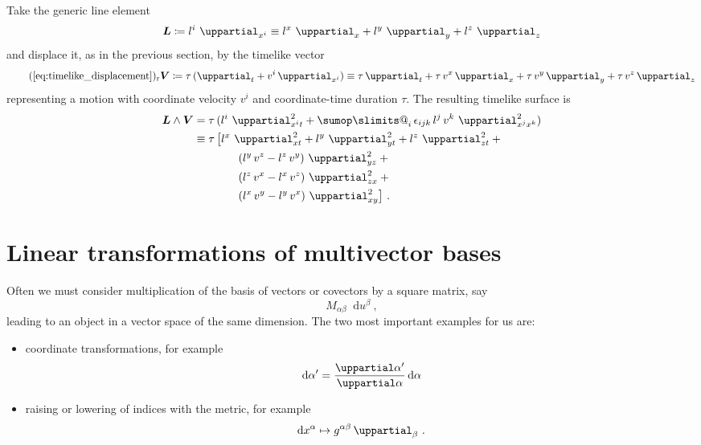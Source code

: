 \documentclass[a4paper,12pt,%
onecolumn,oneside,article,%
british%
]{memoir}
\makeatletter
\theoremstyle{remark}
\theoremstyle{innote}
\def\sum{\DOTSI\sumop\slimits@}
\newcommand*{\de}{\mathop{}\!\uppartial}%
\newcommand*{\di}{\mathop{}\!\mathrm{d}}%
\newcommand*{\defd}{\coloneqq}
\renewcommand*{\|}[1][]{\nonscript\:#1\vert\nonscript\:\mathopen{}}
\newcommand*{\labelbis}[1]{\tag*{(\ref{#1})$_\text{r}$}}
\newcommand*{\tsum}{\mathop{\textstyle\sum}\nolimits}
\newcommand*{\se}[1]{\de_{#1}}
\newcommand*{\sse}[1]{\de^{2}_{#1}}
\makeatother
\begin{document}
Take the generic line element
\begin{equation}
  \label{eq:line_element}
    \bm{L} \defd l^{i}\, \se{x^{i}}
    \equiv l^{x}\,\se{x} + l^{y}\,\se{y} + l^{z}\,\se{z}
\end{equation}
and displace it, as in the previous section, by the timelike vector
\begin{equation}
  \labelbis{eq:timelike_displacement}
  \bm{V} \defd \tau\, (\se{t} + v^{i}\se{x^{i}})
  \equiv \tau\se{t}
  + \tau\,v^{x}\se{x} + \tau\,v^{y}\se{y} + \tau\,v^{z}\se{z}
\end{equation}
representing a motion with coordinate velocity $v^{i}$ and coordinate-time duration $\tau$. The resulting timelike surface is
\begin{equation}
  \label{eq:timelike_surface}
  \begin{aligned}
    \bm{L}\land\bm{V} &=
    \tau\,(l^{i}\,\sse{x^{i}t} +
    \tsum_{i}\epsilon_{ijk}\,l^{j}\,v^{k}\,\sse{x^{j}x^{k}})
    \\ &\equiv
    \tau\,\bigl[
    l^{x}\,\sse{xt} + l^{y}\,\sse{yt} + l^{z}\,\sse{zt} +{}
\\&\qquad\qquad    (l^{y}\,v^{z} - l^{z}\,v^{y})\,\sse{yz} + {}
\\&\qquad\qquad    (l^{z}\,v^{x} - l^{x}\,v^{z})\,\sse{zx} + {}
\\&\qquad\qquad    (l^{x}\,v^{y} - l^{y}\,v^{x})\,\sse{xy}
    \bigl] \ .
  \end{aligned}
\end{equation}


\section{Linear transformations of multivector bases}
\label{sec:lintransf_multiv}

Often we must consider multiplication of the basis of vectors or covectors by a square matrix, say
\begin{equation*}
  \label{eq:matrix_mult_bases}
  M_{\alpha\beta}\di u^{\beta} \ ,
\end{equation*}
leading to an object in a vector space of the same dimension. The two most important examples for us are:
\begin{itemize}
\item coordinate transformations, for example
  \begin{equation*}
   \di \alpha'= \frac{\de \alpha'}{\de \alpha}\di \alpha
  \end{equation*}
\item raising or lowering of indices with the metric, for example
  \begin{equation*}
  \di x^{\alpha} \mapsto  g^{\alpha\beta}\de_{\beta} \ .
  \end{equation*}
\end{itemize}
\end{document}
